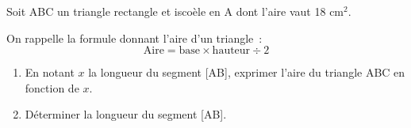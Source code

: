 \documentclass[exercice]{thedocument}%
\begin{document}
%
Soit ABC un triangle rectangle et iscoèle en A dont l'aire vaut 18 cm$^2$.\par
\medskip\noindent
{}\par\medskip\noindent
On rappelle la formule donnant l'aire d'un triangle~:
$$\text{Aire}=\text{base}\times\text{hauteur}\div2$$
\begin{enumerate}
    \item En notant $x$ la longueur du segment [AB], exprimer l'aire du triangle ABC
    en fonction de $x$.
    \item Déterminer la longueur du segment [AB].
\end{enumerate}
\end{document}
